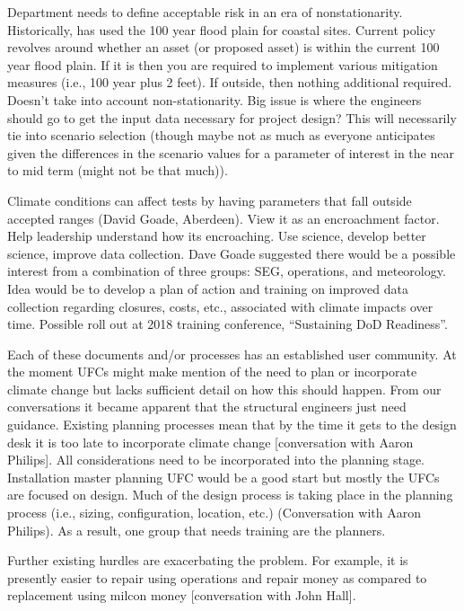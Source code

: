 \documentclass[10pt]{amsart}
\begin{document}
Department needs to define acceptable risk in an era of nonstationarity.
Historically, has used the 100 year flood plain for coastal sites.
Current policy revolves around whether an asset (or proposed asset) is within the current 100 year flood plain.
If it is then you are required to implement various mitigation measures (i.e., 100 year plus 2 feet). 
If outside, then nothing additional required.
Doesn't take into account non-stationarity.
Big issue is where the engineers should go to get the input data necessary for project design?
This will necessarily tie into scenario selection (though maybe not as much as everyone anticipates given the differences in the scenario values for a parameter of interest in the near to mid term (might not be that much)). 

Climate conditions can affect tests by having parameters that fall outside accepted ranges \parencite{}(David Goade, Aberdeen).
View it as an encroachment factor. 
Help leadership understand how its encroaching. 
Use science, develop better science, improve data collection. 
Dave Goade suggested there would be a possible interest from a combination of three groups: SEG, operations, and meteorology. Idea would be to develop a plan of action and training on improved data collection regarding closures, costs, etc., associated with climate impacts over time. Possible roll out at 2018 training conference, “Sustaining DoD Readiness”. 

Each of these documents and/or processes has an established user community.
At the moment UFCs might make mention of the need to plan or incorporate climate change but lacks sufficient detail on how this should happen.
From our conversations it became apparent that the structural engineers just need guidance. 
Existing planning processes mean that by the time it gets to the design desk it is too late to incorporate climate change \parencite{}[conversation with Aaron Philips].
All considerations need to be incorporated into the planning stage. 
Installation master planning UFC would be a good start but mostly the UFCs are focused on design.
Much of the design process is taking place in the planning process (i.e., sizing, configuration, location, etc.) \parencite{}(Conversation with Aaron Philips).
As a result, one group that needs training are the planners. 
 
Further existing hurdles are exacerbating the problem.
For example, it is presently easier to repair using operations and repair money as compared to replacement using milcon money \parencite{}[conversation with John Hall].
\end{document}

